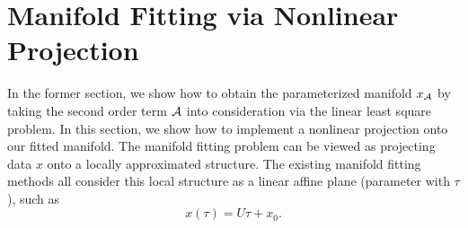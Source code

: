 \documentclass{article}
\newtheorem{theorem}{Theorem}[section]
\theoremstyle{remark}
\newtheorem*{remark}{Remark}
\begin{document}
%

\section{Manifold Fitting via Nonlinear Projection}
In the former section, we show how to obtain the parameterized manifold $x_{\cal A}$ by taking the second order term $\cal A$ into consideration via the linear least square problem. In this section, we show how to implement a nonlinear projection onto our fitted manifold. %
The manifold fitting problem can be viewed as projecting data $x$ onto a locally approximated structure. The existing manifold fitting methods all consider this local structure as a linear affine plane (parameter with $\tau$), such as
\[
 x(\tau)  =  U \tau +x_0.
\]
\end{document}
